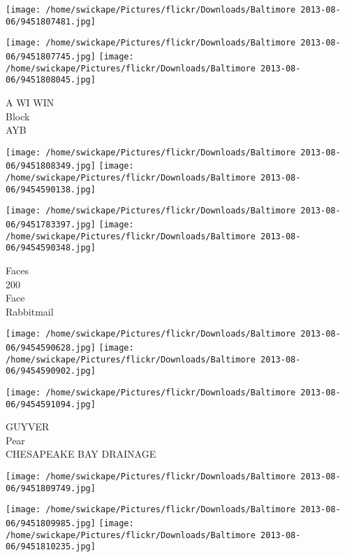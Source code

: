 \documentclass[10pt,letterpaper]{article}
\begin{document}
\texttt{[image: /home/swickape/Pictures/flickr/Downloads/Baltimore 2013-08-06/9451807481.jpg]}

\vspace{0.25in}
\texttt{[image: /home/swickape/Pictures/flickr/Downloads/Baltimore 2013-08-06/9451807745.jpg]}
\texttt{[image: /home/swickape/Pictures/flickr/Downloads/Baltimore 2013-08-06/9451808045.jpg]}

A WI WIN\\
Block\\
AYB\\
\pagebreak

\texttt{[image: /home/swickape/Pictures/flickr/Downloads/Baltimore 2013-08-06/9451808349.jpg]}
\texttt{[image: /home/swickape/Pictures/flickr/Downloads/Baltimore 2013-08-06/9454590138.jpg]}

\texttt{[image: /home/swickape/Pictures/flickr/Downloads/Baltimore 2013-08-06/9451783397.jpg]}
\texttt{[image: /home/swickape/Pictures/flickr/Downloads/Baltimore 2013-08-06/9454590348.jpg]}

Faces\\
200\\
Face\\
Rabbitmail\\
\pagebreak

\texttt{[image: /home/swickape/Pictures/flickr/Downloads/Baltimore 2013-08-06/9454590628.jpg]}
\texttt{[image: /home/swickape/Pictures/flickr/Downloads/Baltimore 2013-08-06/9454590902.jpg]}

\vspace{0.25in}
\texttt{[image: /home/swickape/Pictures/flickr/Downloads/Baltimore 2013-08-06/9454591094.jpg]}

GUYVER\\
Pear\\
CHESAPEAKE BAY DRAINAGE\\
\pagebreak

\texttt{[image: /home/swickape/Pictures/flickr/Downloads/Baltimore 2013-08-06/9451809749.jpg]}

\vspace{0.25in}
\texttt{[image: /home/swickape/Pictures/flickr/Downloads/Baltimore 2013-08-06/9451809985.jpg]}
\texttt{[image: /home/swickape/Pictures/flickr/Downloads/Baltimore 2013-08-06/9451810235.jpg]}
\end{document}

